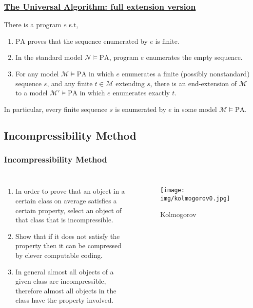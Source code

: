 \documentclass[UTF8,11pt,colorlinks,compress,openany]{beamer}%
\begin{document}
\begin{frame}\frametitle{\href{https://arxiv.org/abs/1801.04599}{The Universal Algorithm: full extension version}}
\begin{theorem}[Woodin]
There is a program $e$ s.t,
\begin{enumerate}
	\item $\mathrm{PA}$ proves that the sequence enumerated by $e$ is finite.
	\item In the standard model $\mathcal{N}\vDash\mathrm{PA}$, program $e$ enumerates the empty sequence.
	\item For any model $\mathcal{M}\vDash\mathrm{PA}$ in which $e$ enumerates a finite (possibly nonstandard) sequence $s$, and any finite $t\in\mathcal{M}$ extending $s$, there is an end-extension of $\mathcal{M}$ to a model $\mathcal{M}'\vDash\mathrm{PA}$ in which $e$ enumerates exactly $t$.
\end{enumerate}
\end{theorem}
In particular, every finite sequence $s$ is enumerated by $e$ in some model $\mathcal{M}\vDash\mathrm{PA}$.
\end{frame}

\subsection{Incompressibility Method}

\begin{frame}\frametitle{Incompressibility Method}
	\begin{columns}
			\begin{enumerate}
				\item In order to prove that an object in a certain class on average satisfies a certain property, select an object of that class that is incompressible.
				\item Show that if it does not satisfy the property then it can be compressed by clever computable coding.
				\item In general almost all objects of a given class are incompressible, therefore almost all objects in the class have the property involved.
			\end{enumerate}
			\begin{figure}
				\texttt{[image: img/kolmogorov0.jpg]}\caption{Kolmogorov}
			\end{figure}
	\end{columns}
\end{frame}
\end{document}

